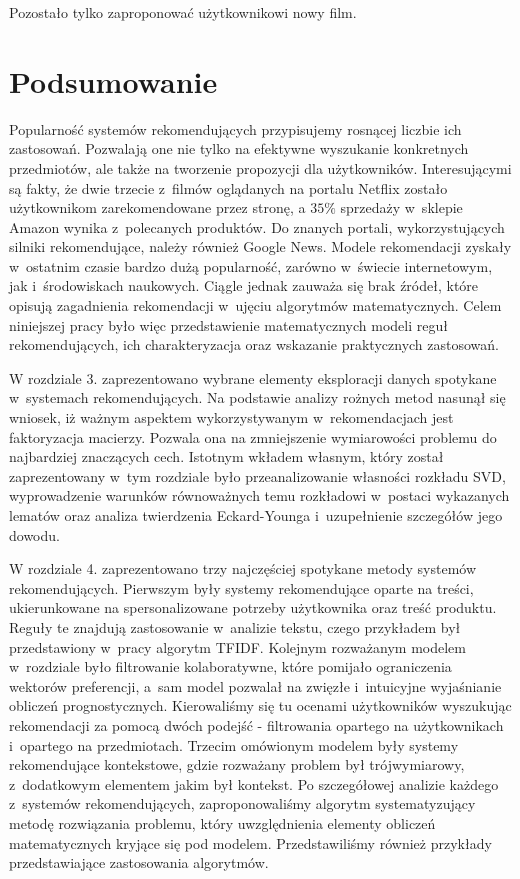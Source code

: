\documentclass[12pt,a4paper]{report}
\begin{document}
Pozostało tylko zaproponować użytkownikowi nowy film.


\chapter{Podsumowanie}

Popularność systemów rekomendujących przypisujemy rosnącej liczbie ich zastosowań. Pozwalają one nie tylko na efektywne wyszukanie konkretnych przedmiotów, ale także na tworzenie propozycji dla użytkowników. Interesującymi są fakty, że dwie trzecie z~filmów oglądanych na portalu Netflix zostało użytkownikom zarekomendowane przez stronę, a $35 \% $ sprzedaży w~sklepie Amazon wynika z~polecanych produktów. Do znanych portali, wykorzystujących silniki rekomendujące, należy również Google News. Modele rekomendacji zyskały w~ostatnim czasie bardzo dużą popularność, zarówno w~świecie internetowym, jak i~środowiskach naukowych. Ciągle jednak zauważa się brak źródeł, które opisują zagadnienia rekomendacji w~ujęciu algorytmów matematycznych. Celem niniejszej pracy było więc przedstawienie matematycznych modeli reguł rekomendujących, ich charakteryzacja oraz wskazanie praktycznych zastosowań.

W rozdziale 3. zaprezentowano wybrane elementy eksploracji danych spotykane w~systemach rekomendujących. Na podstawie analizy rożnych metod nasunął się wniosek, iż ważnym aspektem wykorzystywanym w~rekomendacjach jest faktoryzacja macierzy. Pozwala ona na zmniejszenie wymiarowości problemu do najbardziej znaczących cech. Istotnym wkładem własnym, który został zaprezentowany w~tym rozdziale było przeanalizowanie własności rozkładu SVD, wyprowadzenie warunków równoważnych temu rozkładowi w~postaci wykazanych lematów oraz analiza twierdzenia Eckard-Younga i~uzupełnienie szczegółów jego dowodu.

W rozdziale 4. zaprezentowano trzy najczęściej spotykane metody systemów rekomendujących. Pierwszym były systemy rekomendujące oparte na treści, ukierunkowane na spersonalizowane potrzeby użytkownika oraz treść produktu. Reguły te znajdują zastosowanie w~analizie tekstu, czego przykładem był przedstawiony w~pracy algorytm TFIDF. Kolejnym rozważanym modelem w~rozdziale było filtrowanie kolaboratywne, które pomijało ograniczenia wektorów preferencji, a~sam model pozwalał na zwięzłe i~intuicyjne wyjaśnianie obliczeń prognostycznych. Kierowaliśmy się tu ocenami użytkowników wyszukując rekomendacji za pomocą dwóch podejść - filtrowania opartego na użytkownikach i~opartego na przedmiotach. Trzecim omówionym modelem były systemy rekomendujące kontekstowe, gdzie rozważany problem był trójwymiarowy, z~dodatkowym elementem jakim był kontekst. Po szczegółowej analizie każdego z~systemów rekomendujących, zaproponowaliśmy algorytm systematyzujący metodę rozwiązania problemu, który uwzględnienia elementy obliczeń matematycznych kryjące się pod modelem. Przedstawiliśmy również przykłady przedstawiające zastosowania algorytmów.
\end{document}
